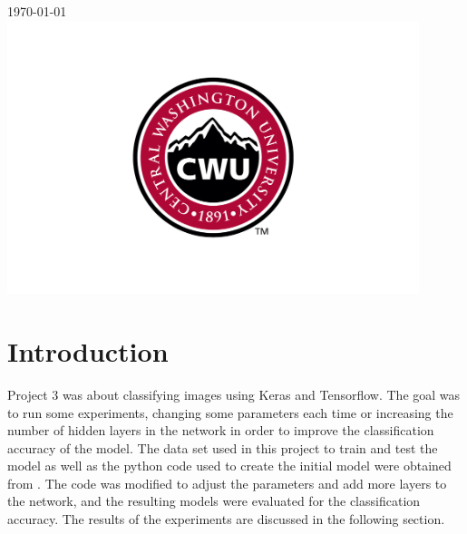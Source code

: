 \documentclass[12pt]{article}
\begin{document}
\begin{titlepage}
		
		
		{\large \today}\\ %
		
		
		\includegraphics[width=12cm]{CWU-Logo.png}\\[.5cm] %
		
		
		\vfill %
		
	\end{titlepage}
	\newpage
	\tableofcontents
	\newpage
	
	
	
	\section{Introduction}
		Project 3 was about classifying images using Keras and Tensorflow. The goal was to run some experiments, changing some parameters each time or increasing the number of hidden layers in the network in order to improve the classification accuracy of the model. The data set used in this project to train and test the model as well as the python code used to create the initial model were obtained from \cite{1}. The code was modified to adjust the parameters and add more layers to the network, and the resulting models were evaluated for the classification accuracy. The results of the experiments are discussed in the following section.
		
\end{document}
